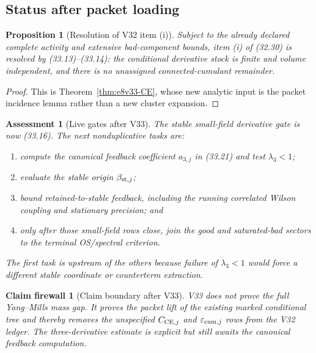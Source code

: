 \documentclass[11pt,oneside]{book}
\newtheorem{proposition}[theorem]{Proposition}
\newtheorem{assessment}[theorem]{Assessment}
\newtheorem{firewall}[theorem]{Claim firewall}
\theoremstyle{definition}
\theoremstyle{remark}
\begin{document}
\subsection{Status after packet loading}

\begin{proposition}[Resolution of V32 item (i)]
\label{prop:e8v33-item-i}
Subject to the already declared complete activity and extensive
bad-component bounds, item (i) of (32.30) is resolved by
(33.13)--(33.14): the conditional derivative stock is finite and
volume independent, and there is no unassigned connected-cumulant
remainder.
\end{proposition}

\begin{proof}
This is Theorem~\ref{thm:e8v33-CE}, whose new analytic input is the
packet incidence lemma rather than a new cluster expansion.
\end{proof}

\begin{assessment}[Live gates after V33]
\label{ass:e8v33-status}
The stable small-field derivative gate is now (33.16).  The next
nonduplicative tasks are:
\begin{enumerate}
\item compute the canonical feedback coefficient \(a_{3,j}\) in
      (33.21) and test \(\lambda_3<1\);
\item evaluate the stable origin \(\beta_{{\rm st},j}\);
\item bound retained-to-stable feedback, including the running
      correlated Wilson coupling and stationary precision; and
\item only after those small-field rows close, join the good and
      saturated-bad sectors to the terminal OS/spectral criterion.
\end{enumerate}
The first task is upstream of the others because failure of
\(\lambda_3<1\) would force a different stable coordinate or
counterterm extraction.
\end{assessment}

\begin{firewall}[Claim boundary after V33]
\label{fire:e8v33-claim}
V33 does not prove the full Yang--Mills mass gap.  It proves the
packet lift of the existing marked conditional tree and thereby
removes the unspecified \(C_{{\rm CE},j}\) and
\(\varepsilon_{{\rm cum},j}\) rows from the V32 ledger.  The
three-derivative estimate is explicit but still awaits the canonical
feedback computation.
\end{firewall}
\end{document}
